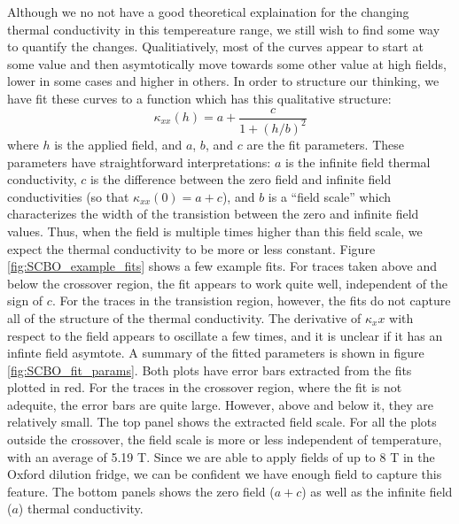 \documentclass{thesis-umich}
\begin{document}
Although we no not have a good theoretical explaination for the changing thermal conductivity in this tempereature range, we still wish to find some way to quantify the changes. Qualitiatively, most of the curves appear to start at some value and then asymtotically move towards some other value at high fields, lower in some cases and higher in others. In order to structure our thinking, we have fit these curves to a function which has this qualitative structure:
\[ \kappa_{xx}(h) = a + \frac{c}{1 + (h/b)^2}\]
where $h$ is the applied field, and $a$, $b$, and $c$ are the fit parameters. These parameters have straightforward interpretations: $a$ is the infinite field thermal conductivity, $c$ is the difference between the zero field and infinite field conductivities (so that $\kappa_{xx}(0) = a + c$), and $b$ is a ``field scale'' which characterizes the width of the transistion between the zero and infinite field values. Thus, when the field is multiple times higher than this field scale, we expect the thermal conductivity to be more or less constant. Figure \ref{fig:SCBO_example_fits} shows a few example fits. For traces taken above and below the crossover region, the fit appears to work quite well, independent of the sign of $c$. For the traces in the transistion region, however, the fits do not capture all of the structure of the thermal conductivity. The derivative of $\kappa_xx$ with respect to the field appears to oscillate a few times, and it is unclear if it has an infinte field asymtote. A summary of the fitted parameters is shown in figure \ref{fig:SCBO_fit_params}. Both plots have error bars extracted from the fits plotted in red. For the traces in the crossover region, where the fit is not adequite, the error bars are quite large. However, above and below it, they are relatively small. The top panel shows the extracted field scale. For all the plots outside the crossover, the field scale is more or less independent of temperature, with an average of 5.19 T. Since we are able to apply fields of up to 8 T in the Oxford dilution fridge, we can be confident we have enough field to capture this feature. The bottom panels shows the zero field ($a + c$) as well as the infinite field ($a$) thermal conductivity. 
\end{document}
